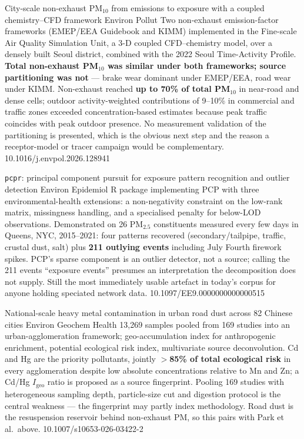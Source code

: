 \documentclass[10pt]{article}
\begin{document}
{City-scale non-exhaust PM$_{10}$ from emissions to exposure with a coupled chemistry--CFD framework}
{Environ Pollut}
{Two non-exhaust emission-factor frameworks (EMEP/EEA Guidebook and KIMM) implemented in
the Fine-scale Air Quality Simulation Unit, a 3-D coupled CFD--chemistry model, over a
densely built Seoul district, combined with the 2022 Seoul Time-Activity Profile.
\textbf{Total non-exhaust PM$_{10}$ was similar under both frameworks; source
partitioning was not} --- brake wear dominant under EMEP/EEA, road wear under KIMM.
Non-exhaust reached \textbf{up to 70\% of total PM$_{10}$} in near-road and dense cells;
outdoor activity-weighted contributions of 9--10\% in commercial and traffic zones
exceeded concentration-based estimates because peak traffic coincides with peak outdoor
presence. No measurement validation of the partitioning is presented, which is the
obvious next step and the reason a receptor-model or tracer campaign would be
complementary.}
{10.1016/j.envpol.2026.128941}

{\texttt{pcpr}: principal component pursuit for exposure pattern recognition and outlier detection}
{Environ Epidemiol}
{R package implementing PCP with three environmental-health extensions: a non-negativity
constraint on the low-rank matrix, missingness handling, and a specialised penalty for
below-LOD observations. Demonstrated on 26 PM$_{2.5}$ constituents measured every few
days in Queens, NYC, 2015--2021: four patterns recovered (secondary/tailpipe, traffic,
crustal dust, salt) plus \textbf{211 outlying events} including July Fourth firework
spikes. PCP's sparse component is an outlier detector, not a source; calling the 211
events ``exposure events'' presumes an interpretation the decomposition does not supply.
Still the most immediately usable artefact in today's corpus for anyone holding speciated
network data.}
{10.1097/EE9.0000000000000515}

{National-scale heavy metal contamination in urban road dust across 82 Chinese cities}
{Environ Geochem Health}
{13{,}269 samples pooled from 169 studies into an urban-agglomeration framework;
geo-accumulation index for anthropogenic enrichment, potential ecological risk index,
multivariate source deconvolution. Cd and Hg are the priority pollutants, jointly
\textbf{$>$85\% of total ecological risk} in every agglomeration despite low absolute
concentrations relative to Mn and Zn; a Cd/Hg $I_{\text{geo}}$ ratio is proposed as a
source fingerprint. Pooling 169 studies with heterogeneous sampling depth, particle-size
cut and digestion protocol is the central weakness --- the fingerprint may partly index
methodology. Road dust is the resuspension reservoir behind non-exhaust PM, so this pairs
with Park et al.\ above.}
{10.1007/s10653-026-03422-2}
\end{document}
